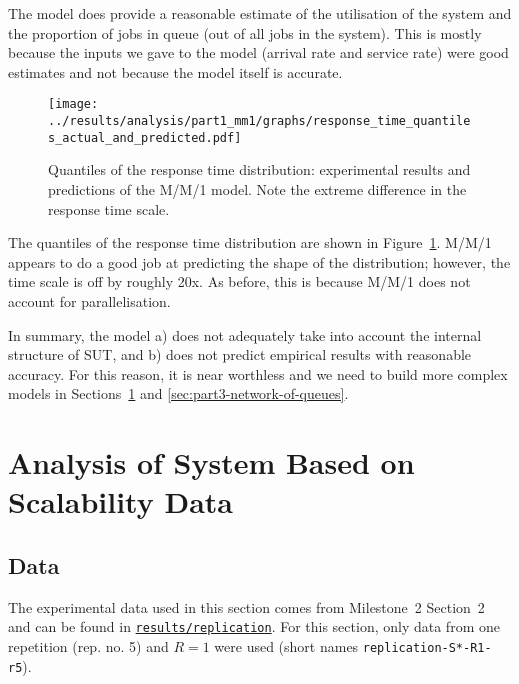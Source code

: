 \documentclass[11pt]{article}
\begin{document}
The model does provide a reasonable estimate of the utilisation of the system and the proportion of jobs in queue (out of all jobs in the system). This is mostly because the inputs we gave to the model (arrival rate and service rate) were good estimates and not because the model itself is accurate.


\begin{figure}[h]
\texttt{[image: ../results/analysis/part1\_mm1/graphs/response\_time\_quantiles\_actual\_and\_predicted.pdf]}
\caption{Quantiles of the response time distribution: experimental results and predictions of the M/M/1 model. Note the extreme difference in the response time scale.}
\label{fig:part1:quantiles_responsetime}
\end{figure}


The quantiles of the response time distribution are shown in Figure~\ref{fig:part1:quantiles_responsetime}. M/M/1 appears to do a good job at predicting the shape of the distribution; however, the time scale is off by roughly 20x. As before, this is because M/M/1 does not account for parallelisation.

In summary, the model a) does not adequately take into account the internal structure of SUT, and b) does not predict empirical results with reasonable accuracy. For this reason, it is near worthless and we need to build more complex models in Sections~\ref{sec:part2-analysis-scalability} and \ref{sec:part3-network-of-queues}.

\clearpage
\section{Analysis of System Based on Scalability Data}\label{sec:part2-analysis-scalability}

\subsection{Data}

The experimental data used in this section comes from Milestone~2 Section~2 and can be found in \texttt{\href{https://gitlab.inf.ethz.ch/pungast/asl-fall16-project/tree/master/results/replication}{results/replication}}. For this section, only data from one repetition (rep. no. 5) and $R=1$ were used (short names \texttt{replication-S*-R1-r5}).
\end{document}
